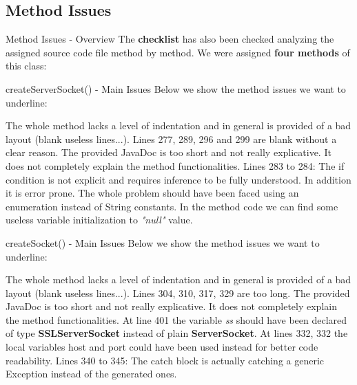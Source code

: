 \documentclass{../common/latex_classes/pdf_presentation}
\newcommand{\renderPartialCode}[2]{
	
}
\begin{document}
	\subsection{Method Issues}
	
	\begin{frame}{Method Issues - Overview}
		The \textbf{checklist} has also been checked analyzing the assigned source code file method by method.
		We were assigned \textbf{four methods} of this class:
		\configureJava{}
		\renderPartialCode{275}{276}
		\renderPartialCode{310}{310}
		\renderPartialCode{368}{369}
		\renderPartialCode{438}{438}
	\end{frame}
	
	\begin{frame}{createServerSocket() - Main Issues}
		Below we show the method issues we want to underline:
		\begin{itemize}
			 The whole method 	lacks a level of indentation and in general is provided of a bad layout (blank useless lines...).
			 Lines 277, 289, 296 and 299 are blank without a clear reason.
			 The provided JavaDoc is too short and not really explicative. It does not completely explain the method functionalities.
			 Lines 283 to 284: The if condition is not explicit and requires inference to be fully understood. In addition it is error prone. The whole problem should have been faced using an enumeration instead of String constants.
			 In the method code we can find some useless variable initialization to \textit{"null"} value.
		\end{itemize}
	\end{frame}
	
	\begin{frame}{createSocket() - Main Issues}
		Below we show the method issues we want to underline:
		\begin{itemize}
			 The whole method 	lacks a level of indentation and in general is provided of a bad layout (blank useless lines...).
			 Lines 304, 310, 317, 329 are too long.
			 The provided JavaDoc is too short and not really explicative. It does not completely explain the method functionalities.
			 At line 401 the variable \textit{ss} should have been declared of type \textbf{SSLServerSocket} instead of plain \textbf{ServerSocket}.
			 At lines 332, 332 the local variables host and port could have been used instead for better code readability.
			 Lines 340 to 345: The catch block is actually catching a generic Exception instead of the generated ones.
		\end{itemize}
	\end{frame}
	
\end{document}
